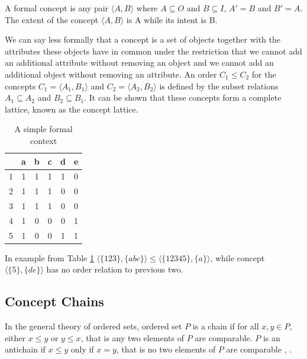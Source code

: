 \documentclass[acmconf,authordraft]{acmart}
\begin{document}
\begin{definition}
A formal concept is any pair $\langle A, B \rangle$ where $A \subseteq O $ and $ B \subseteq I $, $A' = B$ and $B' = A$.
The extent of the concept $\langle A, B \rangle$ is A while its intent is B.
\end{definition}

We can say less formally that a concept is a set of objects together with the  attributes these objects have in common under the restriction that we cannot add an additional attribute without removing an object and we cannot add an additional object without removing an attribute. 
An order $C_1 \leq C_2$  for the concepts $C_1 = \langle A_1, B_1 \rangle$ and $C_2 = \langle A_2, B_2 \rangle$ is defined by the subset relations $A_1 \subseteq A_2$ and $B_2 \subseteq B_1$. It can be shown \cite{davey_introduction_2002} that these concepts form a complete lattice, known as the concept lattice. 

\begin{table}
  \caption{A simple  formal context}
  \label{tab:simplecontext}
  \begin{tabular}{lccccc}
    \toprule
    & a & b & c & d & e\\
    \midrule
    1 & 1 & 1 & 1 & 1 & 0\\
    2 & 1 & 1 & 1 & 0 & 0\\
    3 & 1 & 1 & 1 & 0 & 0\\
    4 & 1 & 0 & 0 & 0 & 1\\
    5 & 1 & 0 & 0 & 1 & 1\\
  \bottomrule
\end{tabular}
\end{table}


In example from Table \ref{tab:simplecontext}   $\langle \{123\}, \{abc\} \rangle \leq \langle \{12345\}, \{a\} \rangle$, while concept $\langle \{5\}, \{de\} \rangle$ has no order relation to previous two.

\subsection{Concept Chains}

In the general theory of ordered sets, ordered set $P$ is a chain if for all $x, y \in P$, either $x \leq y$ or $y \leq x$, that is any two elements of $P$ are comparable. $P$ is an antichain if $x \leq y$ only if $x=y$, that is no two elements of $P$ are comparable \cite{davey_introduction_2002}, \cite{ore_chains_1943}.
\end{document}
